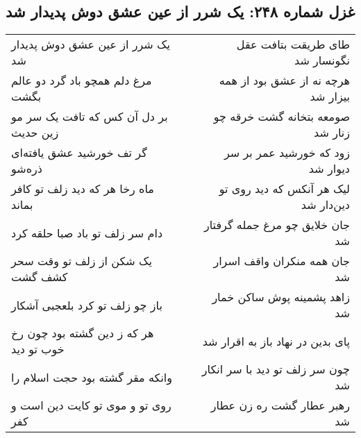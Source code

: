\begin{center}
\section*{غزل شماره ۲۴۸: یک شرر از عین عشق دوش پدیدار شد}
\label{sec:248}
\begin{longtable}{l p{0.5cm} r}
یک شرر از عین عشق دوش پدیدار شد
&&
طای طریقت بتافت عقل نگونسار شد
\\
مرغ دلم همچو باد گرد دو عالم بگشت
&&
هرچه نه از عشق بود از همه بیزار شد
\\
بر دل آن کس که تافت یک سر مو زین حدیث
&&
صومعه بتخانه گشت خرقه چو زنار شد
\\
گر تف خورشید عشق یافته‌ای ذره‌شو
&&
زود که خورشید عمر بر سر دیوار شد
\\
ماه رخا هر که دید زلف تو کافر بماند
&&
لیک هر آنکس که دید روی تو دین‌دار شد
\\
دام سر زلف تو باد صبا حلقه کرد
&&
جان خلایق چو مرغ جمله گرفتار شد
\\
یک شکن از زلف تو وقت سحر کشف گشت
&&
جان همه منکران واقف اسرار شد
\\
باز چو زلف تو کرد بلعجبی آشکار
&&
زاهد پشمینه پوش ساکن خمار شد
\\
هر که ز دین گشته بود چون رخ خوب تو دید
&&
پای بدین در نهاد باز به اقرار شد
\\
وانکه مقر گشته بود حجت اسلام را
&&
چون سر زلف تو دید با سر انکار شد
\\
روی تو و موی تو کایت دین است و کفر
&&
رهبر عطار گشت ره زن عطار شد
\\
\end{longtable}
\end{center}
